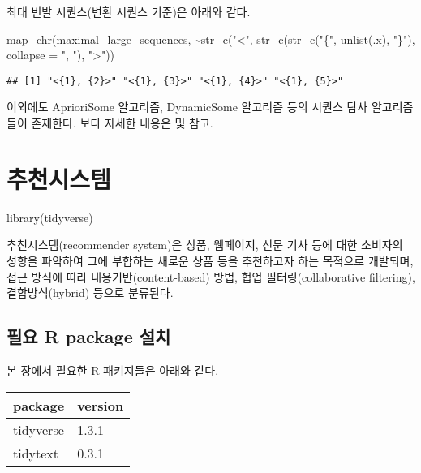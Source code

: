 \documentclass[
]{book}
\newenvironment{Shaded}{\begin{snugshade}}{\end{snugshade}}
\newcommand{\AttributeTok}[1]{\textcolor[rgb]{0.77,0.63,0.00}{#1}}
\newcommand{\FunctionTok}[1]{\textcolor[rgb]{0.00,0.00,0.00}{#1}}
\newcommand{\NormalTok}[1]{#1}
\newcommand{\SpecialCharTok}[1]{\textcolor[rgb]{0.00,0.00,0.00}{#1}}
\newcommand{\StringTok}[1]{\textcolor[rgb]{0.31,0.60,0.02}{#1}}
\begin{document}
최대 빈발 시퀀스(변환 시퀀스 기준)은 아래와 같다.

\begin{Shaded}
\begin{Highlighting}[]
\FunctionTok{map\_chr}\NormalTok{(maximal\_large\_sequences, }
    \SpecialCharTok{\textasciitilde{}}\FunctionTok{str\_c}\NormalTok{(}\StringTok{"\textless{}"}\NormalTok{, }\FunctionTok{str\_c}\NormalTok{(}\FunctionTok{str\_c}\NormalTok{(}\StringTok{"\{"}\NormalTok{, }\FunctionTok{unlist}\NormalTok{(.x), }\StringTok{"\}"}\NormalTok{), }\AttributeTok{collapse =} \StringTok{", "}\NormalTok{), }\StringTok{"\textgreater{}"}\NormalTok{))}
\end{Highlighting}
\end{Shaded}

\begin{verbatim}
## [1] "<{1}, {2}>" "<{1}, {3}>" "<{1}, {4}>" "<{1}, {5}>"
\end{verbatim}

이외에도 AprioriSome 알고리즘, DynamicSome 알고리즘 등의 시퀀스 탐사 알고리즘 들이 존재한다. 보다 자세한 내용은 \citet{jun2012datamining} 및 \citet{agrawal1995mining} 참고.

\hypertarget{recommender-system}{%
\chapter{추천시스템}\label{recommender-system}}

\begin{Shaded}
\begin{Highlighting}[]
\FunctionTok{library}\NormalTok{(tidyverse)}
\end{Highlighting}
\end{Shaded}

추천시스템(recommender system)은 상품, 웹페이지, 신문 기사 등에 대한 소비자의 성향을 파악하여 그에 부합하는 새로운 상품 등을 추천하고자 하는 목적으로 개발되며, 접근 방식에 따라 내용기반(content-based) 방법, 협업 필터링(collaborative filtering), 결합방식(hybrid) 등으로 분류된다.

\hypertarget{recommender-packages-install}{%
\section{필요 R package 설치}\label{recommender-packages-install}}

본 장에서 필요한 R 패키지들은 아래와 같다.

\begin{tabular}{l|l}
\hline
package & version\\
\hline
tidyverse & 1.3.1\\
\hline
tidytext & 0.3.1\\
\hline
\end{tabular}
\end{document}
